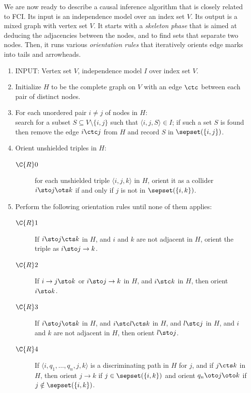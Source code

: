 We are now ready to describe a causal inference algorithm that is closely related to FCI.
Its input is an independence model over an index set $V$. Its output is a mixed graph with vertex set $V$.
It starts with a \emph{skeleton phase} that is aimed at deducing the adjacencies between the nodes, and to find sets that separate two nodes.
Then, it runs various \emph{orientation rules} that iteratively orients edge marks into tails and arrowheads.
\begin{enumerate}
  \item INPUT: Vertex set $V$, independence model $I$ over index set $V$.
  \item Initialize $H$ to be the complete graph on $V$ with an edge $\ctc$ between each pair of distinct nodes.
  \item For each unordered pair $i \ne j$ of nodes in $H$:\\
    search for a subset $S \subseteq V \setminus \{i,j\}$ such that $\langle i, j, S \rangle \in I$;
    if such a set $S$ is found then remove the edge $i \ctc j$ from $H$ and record $S$ in $\sepset(\{i,j\})$.\label{alg:fci_skeleton}
  \item Orient unshielded triples in $H$:\label{alg:fci_R0}
    \begin{description}
    \item[$\C{R}0$] for each unshielded triple $\langle i,j,k \rangle$ in $H$, orient it as a collider $i \sto j \ots k$ if and only if $j$ is not in $\sepset(\{i,k\})$.
    \end{description}
  \item Perform the following orientation rules until none of them applies:
    \begin{description}
      \item[$\C{R}1$] If $i \sto j \cts k$ in $H$, and $i$ and $k$ are not adjacent in $H$, orient the triple as $i \sto j \to k$.
      \item[$\C{R}2$] If $i \to j \sto k$ or $i \sto j \to k$ in $H$, and $i \stc k$ in $H$, then orient $i \sto k$.
      \item[$\C{R}3$] If $i \sto j \ots k$ in $H$, and $i \stc l \cts k$ in $H$, and $l \stc j$ in $H$, and $i$ and $k$ are not adjacent in $H$, then orient $l \sto j$.
      \item[$\C{R}4$] If $\langle i, q_1, \dots, q_n, j, k \rangle$ is a discriminating path in $H$ for $j$, and if $j \cts k$ in $H$, then orient $j \to k$ if $j \in \sepset(\{i,k\})$ and orient $q_n \oto j \oto k$ if $j \notin \sepset(\{i,k\})$.
    \end{description}

\end{enumerate}
